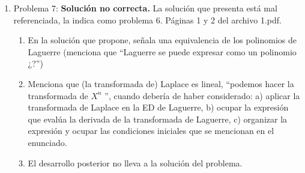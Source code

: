 \begin{enumerate}
\item Problema 7: \textbf{Solución no correcta.} La solución que presenta está mal referenciada, la indica como problema 6. Páginas 1 y 2 del archivo 1.pdf.
\begin{enumerate}[label=\roman*)]
\item En la solución que propone, señala una equivalencia de los polinomios de Laguerre (menciona que \enquote{Laguerre se puede expresar como un polinomio ¿?})
\item Menciona que (la transformada de) Laplace es lineal, \enquote{podemos hacer la transformada de $X^{n}$ }, cuando debería de haber considerado: a) aplicar la transformada de Laplace en la ED de Laguerre, b) ocupar la expresión que evalúa la derivada de la transformada de Laguerre, c) organizar la expresión y ocupar las condiciones iniciales que se mencionan en el enunciado.
\item El desarrollo posterior no lleva a la solución del problema.
\end{enumerate}
\end{enumerate}


